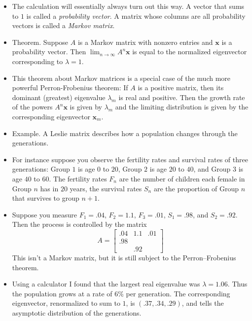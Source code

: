\documentclass[11pt,oneside]{amsbook}
\theoremstyle{definition}
\theoremstyle{plain}
\theoremstyle{definition}
\theoremstyle{remark}
\numberwithin{equation}{section}
\numberwithin{figure}{section}
\begin{document}
\begin{itemize}
\begin{align*}
    &=\frac{1}{2.5}\begin{bmatrix}1.5\\1\end{bmatrix}
     (C_0+D_0)
  \end{align*}
\item The calculation will essentially always turn out this way. A vector that sums to $1$ is called a \emph{probability vector}. A matrix whose columns are all probability vectors is called a \emph{Markov matrix}.
\item Theorem. Suppose $A$ is a Markov matrix with nonzero entries and $\mathbf{x}$ is a probability vector. Then $\lim_{n\to\infty}A^n\mathbf{x}$ is equal to the normalized eigenvector corresponding to $\lambda=1$.
\item This theorem about Markov matrices is a special case of the much more powerful Perron-Frobenius theorem: If $A$ is a positive matrix, then its dominant (greatest) eigenvalue $\lambda_m$ is real and positive. Then the growth rate of the powers $A^n\mathbf{x}$ is given by $\lambda_m$ and the limiting distribution is given by the corresponding eigenvector $\mathbf{x}_m$.
\item Example. A Leslie matrix describes how a population changes through the generations.
\item For instance suppose you observe the fertility rates and survival rates of three generations: Group $1$ is age $0$ to $20$, Group $2$ is age $20$ to $40$, and Group $3$ is age $40$ to $60$. The fertility rates $F_n$ are the number of children each female in Group $n$ has in $20$ years, the survival rates $S_n$ are the proportion of Group $n$ that survives to group $n+1$.
\item Suppose you measure $F_1=.04$, $F_2=1.1$, $F_3=.01$, $S_1=.98$, and $S_2=.92$. Then the process is controlled by the matrix
  \[A=\begin{bmatrix}.04&1.1&.01\\.98\\&.92\end{bmatrix}
  \]
  This isn't a Markov matrix, but it is still subject to the Perron--Frobenius theorem.
\item Using a calculator I found that the largest real eigenvalue was $\lambda=1.06$. Thus the population grows at a rate of 6\% per generation. The corresponding eigenvector, renormalized to sum to $1$, is $(.37,.34,.29)$, and tells the asymptotic distribution of the generations.
\end{itemize}
\end{document}
